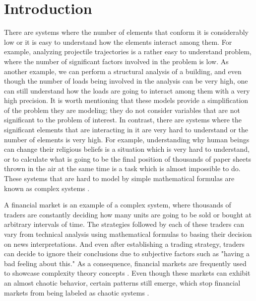 \chapter{Introduction}
\label{chapter:introduction}

There are systems where the number of elements that conform it is considerably
low or it is easy to understand how the elements interact among them. For
example, analyzing projectile trajectories is a rather easy to understand
problem, where the number of significant factors involved in the problem is
low. As another example, we can perform a structural analysis of a building, and
even though the number of loads being involved in the analysis can be very high,
one can still understand how the loads are going to interact among them with a
very high precision. It is worth mentioning that these models provide a
simplification of the problem they are modeling; they do not consider variables
that are not significant to the problem of interest. In contrast, there are
systems where the significant elements that are interacting in it are very hard
to understand or the number of elements is very high. For example, understanding
why human beings can change their religious beliefs is a situation which is very
hard to understand, or to calculate what is going to be the final position of
thousands of paper sheets thrown in the air at the same time is a task which is
almost impossible to do. These systems that are hard to model by simple
mathematical formulas are known as complex systems \cite{Anderson1999}. %

A financial market is an example of a complex system, where thousands of traders
are constantly deciding how many units are going to be sold or bought at
arbitrary intervals of time. The strategies followed by each of these traders
can vary from technical analysis using mathematical formulas to basing their
decision on news interpretations. And even after establishing a trading
strategy, traders can decide to ignore their conclusions due to subjective
factors such as "having a bad feeling about this." As a consequence, financial
markets are frequently used to showcase complexity theory concepts
\cite{Arthur1999} \cite{Bundesbank2007}. Even though these markets can exhibit an
almost chaotic behavior, certain patterns still emerge, which stop financial
markets from being labeled as chaotic systems \cite{Castillo2001}.

